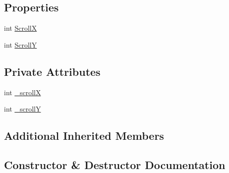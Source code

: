 \subsection*{Properties}
\begin{DoxyCompactItemize}
\item 
int \hyperlink{class_web_analyzer_1_1_models_1_1_event_model_1_1_scroll_event_model_a76d4f01379c721923cb59d88e2c0fc4a}{Scroll\+X}
\item 
int \hyperlink{class_web_analyzer_1_1_models_1_1_event_model_1_1_scroll_event_model_a3e94660e7ec7eb2af5fc06022fbddbcd}{Scroll\+Y}
\end{DoxyCompactItemize}
\subsection*{Private Attributes}
\begin{DoxyCompactItemize}
\item 
int \hyperlink{class_web_analyzer_1_1_models_1_1_event_model_1_1_scroll_event_model_a1fa876768fe33fc66ba5cd358cd523e1}{\+\_\+scroll\+X}
\item 
int \hyperlink{class_web_analyzer_1_1_models_1_1_event_model_1_1_scroll_event_model_a72e1d630edcd50e5f179faae87220ed6}{\+\_\+scroll\+Y}
\end{DoxyCompactItemize}
\subsection*{Additional Inherited Members}


\subsection{Constructor \& Destructor Documentation}
\hypertarget{class_web_analyzer_1_1_models_1_1_event_model_1_1_scroll_event_model_a3838b54daf2a7553722fb03bca9b69dc}{}
